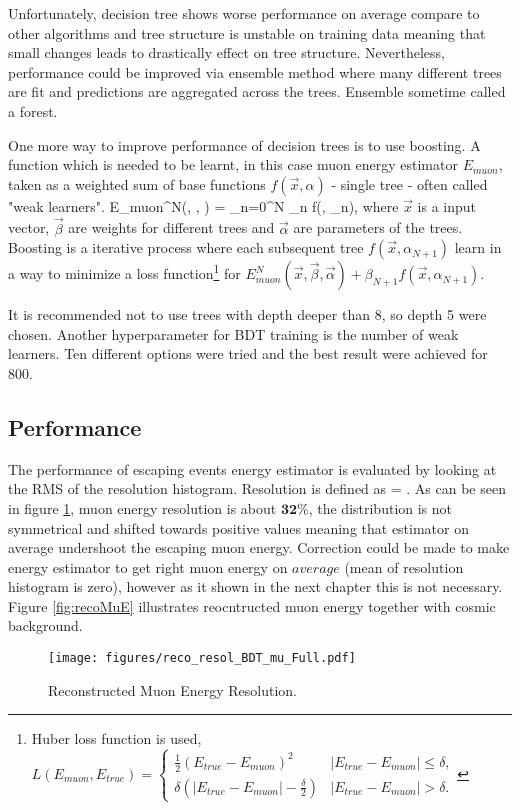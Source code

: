 Unfortunately, decision tree shows worse performance on average compare to other algorithms 
and tree structure is unstable on training data meaning that small changes leads to drastically 
effect on tree structure. Nevertheless, performance could be improved via ensemble method 
where many different trees are fit and predictions are aggregated across the trees. Ensemble 
sometime called a forest.

One more way to improve performance of decision trees is to use boosting. A function which is 
needed to be learnt, in this case muon energy estimator $E_{muon}$, taken as a weighted sum of 
base functions $f(\vec{x}, \alpha)$ - single tree - often called "weak learners". 
\be
E_{muon}^N(, \vec{\beta}, \vec{\alpha}) = \sum_{n=0}^N \beta_n f(, \alpha_n),
\ee
where $\vec{x}$ is a input vector, $\vec{\beta}$ are weights for different trees and $\vec{\alpha}$
are parameters of the trees. Boosting is a iterative process where each subsequent tree 
$f(\vec{x}, \alpha_{N+1})$ learn in a way to minimize a loss function\footnote{Huber loss function
is used,
$
L(E_{muon}, E_{true}) = \begin{cases}
				\frac{1}{2}(E_{true} - E_{muon})^2 & |E_{true} - E_{muon}| \leq \delta, \\
				\delta(|E_{true} - E_{muon}| - \frac{\delta}{2}) & |E_{true} - E_{muon}| > \delta.
			\end{cases}
$} for $E_{muon}^N(\vec{x}, \vec{\beta}, \vec{\alpha}) + \beta_{N+1}f(\vec{x}, \alpha_{N+1})$.

It is recommended not to use trees with depth deeper than 8, so depth 5 were chosen. Another 
hyperparameter for BDT training is the number of weak learners. Ten different options were tried
and the best result were achieved for 800.

\subsection{Performance}
The performance of escaping events energy estimator is evaluated by looking at the RMS of the 
resolution histogram. Resolution is defined as 
\be
{} = .
\ee
As can be seen in figure \ref{fig:recoMuE_resol}, muon energy resolution is about $\textbf{32\%}$, the 
distribution is not symmetrical and shifted towards positive values meaning that estimator on average 
undershoot the escaping muon energy. Correction could be made to make energy estimator to get right
muon energy on $\textit{average}$ (mean of resolution histogram is zero), however as it shown in the 
next chapter this is not necessary. Figure \ref{fig:recoMuE} illustrates reocntructed muon energy together 
with cosmic background. 
\begin{figure}[!th]
\centering
\texttt{[image: figures/reco\_resol\_BDT\_mu\_Full.pdf]}
\caption{Reconstructed Muon Energy Resolution.}
\label{fig:recoMuE_resol}
\end{figure}

